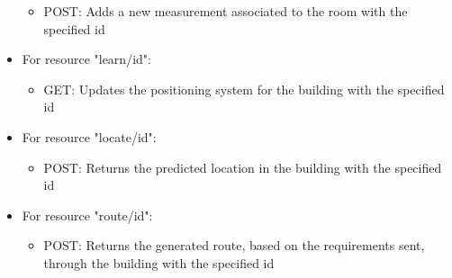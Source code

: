 \begin{itemize}
\begin{itemize}
	\item POST: Adds a new measurement associated to the room with the specified id
	\end{itemize}
\item For resource "learn/id":
	\begin{itemize}
	\item GET: Updates the positioning system for the building with the specified id
	\end{itemize}
\item For resource "locate/id":
	\begin{itemize}
	\item POST: Returns the predicted location in the building with the specified id
	\end{itemize}
\item For resource "route/id":
	\begin{itemize}
	\item POST: Returns the generated route, based on the requirements sent, through the building with the specified id
	\end{itemize}
\end{itemize}

